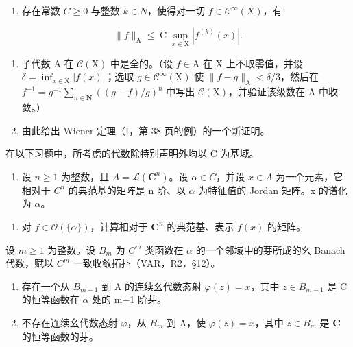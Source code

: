 \begin{enumerate}
\def\labelenumi{\alph{enumi})}
\tightlist
\item
  存在常数 \(C \geqslant 0\) 与整数 \(k \in N\)，使得对一切 \(f \in \mathcal{C}^{\infty}(X)\)，有
\end{enumerate}

\[
\| f \| _ {\mathrm{A}} \leqslant \operatorname * {C} \sup _ {x \in \mathrm{X}} | f ^ {(k)} (x) |.
\]

\begin{enumerate}
\def\labelenumi{\alph{enumi})}
\setcounter{enumi}{1}
\item
  子代数 A 在 \(\mathcal{C}(\mathrm{X})\) 中是全的。（设 \(f \in \mathrm{A}\) 在 X 上不取零值，并设 \(\delta = \inf_{x \in \mathrm{X}} |f(x)|\)；选取 \(g \in \mathcal{C}^{\infty}(\mathrm{X})\) 使 \(\|f - g\|_{\mathrm{A}} < \delta/3\)，然后在 \(f^{-1} = g^{-1} \sum_{n \in \mathbf{N}} ((g - f)/g)^{n}\) 中写出 \(\mathcal{C}(\mathrm{X})\)，并验证该级数在 A 中收敛。）
\item
  由此给出 Wiener 定理（I，第 38 页的例）的一个新证明。
\end{enumerate}


在以下习题中，所考虑的代数除特别声明外均以 C 为基域。

\begin{enumerate}
\def\labelenumi{\arabic{enumi})}
\tightlist
\item
  设 \(n \geqslant 1\) 为整数，且 \(A = \mathcal{L}(\mathbf{C}^{n})\)。设 \(\alpha \in C\)，并设 \(x \in A\) 为一个元素，它相对于 \(C^{n}\) 的典范基的矩阵是 n 阶、以 \(\alpha\) 为特征值的 Jordan 矩阵。x 的谱化为 \(\alpha\)。
\end{enumerate}

\begin{enumerate}
\def\labelenumi{\alph{enumi})}
\tightlist
\item
  对 \(f \in \mathcal{O}(\{\alpha\})\)，计算相对于 \(\mathbf{C}^n\) 的典范基、表示 \(f(x)\) 的矩阵。
\end{enumerate}

  设 \(m \geqslant 1\) 为整数。设 \(B_{m}\) 为 \(C^{m}\) 类函数在 \(\alpha\) 的一个邻域中的芽所成的幺 Banach 代数，赋以 \(C^{m}\) 一致收敛拓扑（VAR，R2，§12）。

\begin{enumerate}
\def\labelenumi{\alph{enumi})}
\setcounter{enumi}{1}
\item
  存在一个从 \(B_{m-1}\) 到 A 的连续幺代数态射 \(\varphi(z)=x\)，其中 \(z\in B_{m-1}\) 是 C 的恒等函数在 \(\alpha\) 处的 m−1 阶芽。
\item
  不存在连续幺代数态射 \(\varphi\)，从 \(B_m\) 到 A，使 \(\varphi(z) = x\)，其中 \(z \in B_m\) 是 \(\mathbf{C}\) 的恒等函数的芽。
\end{enumerate}

